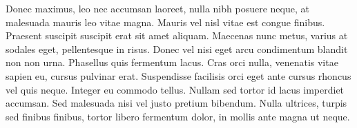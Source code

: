 \documentclass[12pt,twoside,a4paper]{book}
\begin{document}
\begin{table}[htbp]
  
\end{table}

\begin{table}[htbp]
  
\end{table}

\begin{table}[htbp]
  
\end{table}

\begin{table}[htbp]
  
\end{table}

\begin{table}[htbp]
  
\end{table}

\begin{table}[htbp]
  
\end{table}

%  

Donec maximus, leo nec accumsan laoreet, nulla nibh posuere neque, at malesuada
mauris leo vitae magna. Mauris vel nisl vitae est congue finibus.
Praesent suscipit suscipit erat sit amet aliquam. Maecenas nunc metus, varius at
sodales eget, pellentesque in risus.
Donec vel nisi eget arcu condimentum blandit non non urna.
Phasellus quis fermentum lacus.
Cras orci nulla, venenatis vitae sapien eu, cursus pulvinar erat.
Suspendisse facilisis orci eget ante cursus rhoncus vel quis neque.
Integer eu commodo tellus.
Nullam sed tortor id lacus imperdiet accumsan.
Sed malesuada nisi vel justo pretium bibendum.
Nulla ultrices, turpis sed finibus finibus, tortor libero fermentum dolor,
in mollis ante magna ut neque.

\listoftables
\end{document}
